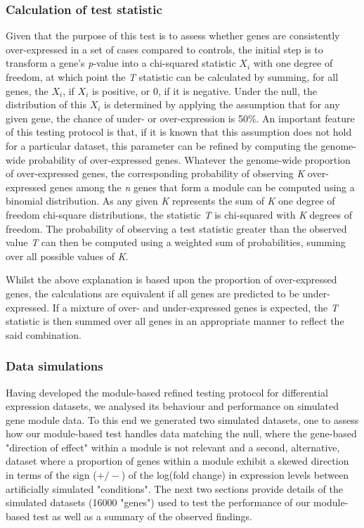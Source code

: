 \subsubsection{Calculation of test statistic}

Given that the purpose of this test is to assess whether genes are consistently over-expressed in a set of cases compared to controls, the initial step is to transform a gene's \textit{p}-value into a chi-squared statistic $X_\textit{i}$ with one degree of freedom, at which point the \textit{T} statistic can be calculated by summing, for all genes, the $X_\textit{i}$, if $X_\textit{i}$ is positive, or 0, if it is negative. Under the null, the distribution of this $X_i$ is determined by applying the assumption that for any given gene, the chance of under- or over-expression is 50\%. An important feature of this testing protocol is that, if it is known that this assumption does not hold for a particular dataset, this parameter can be refined by computing the genome-wide probability of over-expressed genes. Whatever the genome-wide proportion of over-expressed genes, the corresponding probability of observing \textit{K} over-expressed genes among the \textit{n} genes that form a module can be computed using a binomial distribution. As any given \textit{K} represents the sum of \textit{K} one degree of freedom chi-square distributions, the statistic \textit{T} is chi-squared with \textit{K} degrees of freedom. The probability of observing a test statistic greater than the observed value \textit{T} can then be computed using a weighted sum of probabilities, summing over all possible values of \textit{K}. 

Whilst the above explanation is based upon the proportion of over-expressed genes, the calculations are equivalent if all genes are predicted to be under-expressed. If a mixture of over- and under-expressed genes is expected, the \textit{T} statistic is then summed over all genes in an appropriate manner to reflect the said combination.

\subsubsection{Data simulations}

Having developed the module-based refined testing protocol for differential expression datasets, we analysed its behaviour and performance on simulated gene module data. To this end we generated two simulated datasets, one to assess how our module-based test handles data matching the null, where the gene-based "direction of effect" within a module is not relevant and a second, alternative, dataset where a proportion of genes within a module exhibit a skewed direction in terms of the sign ($+/-$) of the log(fold change) in expression levels between artificially simulated "conditions". The next two sections provide details of the simulated datasets (16000 "genes") used to test the performance of our module-based test as well as a summary of the observed findings. 

